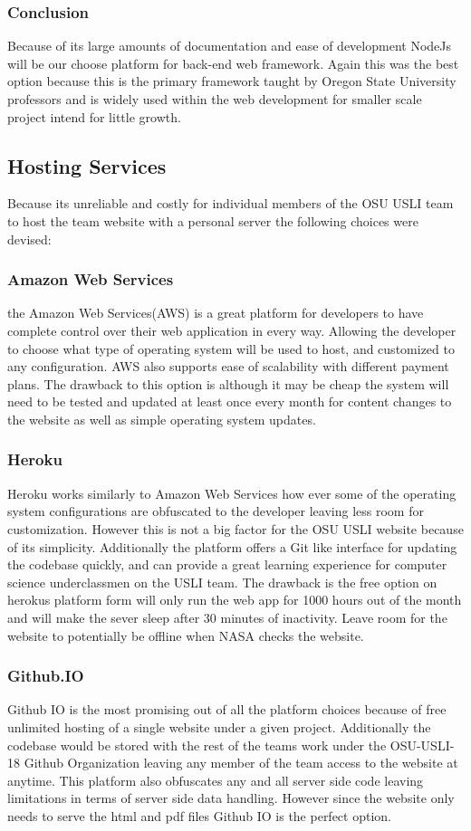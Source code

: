 \documentclass[onecolumn, draftclsnofoot,10pt, compsoc]{IEEEtran}
\begin{document}
    \subsubsection{Conclusion}
    Because of its large amounts of documentation and ease of development NodeJs will be our choose platform for back-end web framework. Again this was the best option because this is the primary framework taught by Oregon State University professors and is widely used within the web development for smaller scale project intend for little growth.
    
    \subsection{Hosting Services}
    Because its unreliable and costly for individual members of the OSU USLI team to host the team website with a personal server the following choices were devised:
    \subsubsection{Amazon Web Services}
    the Amazon Web Services(AWS) is a great platform for developers to have complete control over their web application in every way. Allowing the developer to choose what type of operating system will be used to host, and customized to any configuration. AWS also supports ease of scalability with different payment plans. The drawback to this option is although it may be cheap the system will need to be tested and updated at least once every month for content changes to the website as well as simple operating system updates.
    \subsubsection{Heroku}
    Heroku works similarly to Amazon Web Services how ever some of the operating system configurations are obfuscated to the developer leaving less room for customization. However this is not a big factor for the OSU USLI website because of its simplicity. Additionally the platform offers a Git like interface for updating the codebase quickly, and can provide a great learning experience for computer science underclassmen on the USLI team. The drawback is the free option on herokus platform form will only run the web app for 1000 hours out of the month and will make the sever sleep after 30 minutes of inactivity. Leave room for the website to potentially be offline when NASA checks the website.
    \subsubsection{Github.IO}
    Github IO is the most promising out of all the platform choices because of free unlimited hosting of a single website under a given project. Additionally the codebase would be stored with the rest of the teams work under the OSU-USLI-18 Github Organization leaving any member of the team access to the website at anytime. This platform also obfuscates any and all server side code leaving limitations in terms of server side data handling. However since the website only needs to serve the html and pdf files Github IO is the perfect option. 
\end{document}
